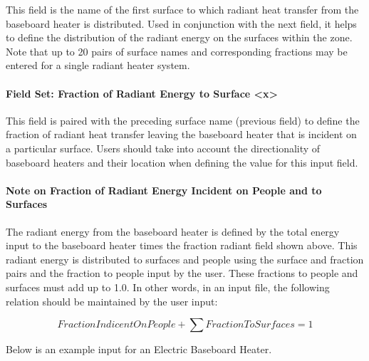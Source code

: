 This field is the name of the first surface to which radiant heat transfer from the baseboard heater is distributed. Used in conjunction with the next field, it helps to define the distribution of the radiant energy on the surfaces within the zone. Note that up to 20 pairs of surface names and corresponding fractions may be entered for a single radiant heater system.

\paragraph{Field Set: Fraction of Radiant Energy to Surface \textless{}x\textgreater{}}\label{field-set-fraction-of-radiant-energy-to-surface-x}

This field is paired with the preceding surface name (previous field) to define the fraction of radiant heat transfer leaving the baseboard heater that is incident on a particular surface. Users should take into account the directionality of baseboard heaters and their location when defining the value for this input field.

\paragraph{Note on Fraction of Radiant Energy Incident on People and to Surfaces}\label{note-on-fraction-of-radiant-energy-incident-on-people-and-to-surfaces-1}

The radiant energy from the baseboard heater is defined by the total energy input to the baseboard heater times the fraction radiant field shown above. This radiant energy is distributed to surfaces and people using the surface and fraction pairs and the fraction to people input by the user. These fractions to people and surfaces must add up to 1.0. In other words, in an input file, the following relation should be maintained by the user input:

\begin{equation}
FractionIndicentOnPeople + \sum {FractionToSurfaces = 1}
\end{equation}

Below is an example input for an Electric Baseboard Heater.

